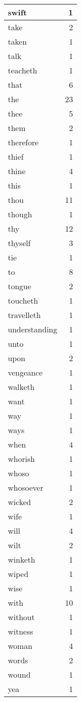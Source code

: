 \begin{center}
\begin{longtable}{l|r}
swift & 1\\ \hline 
take & 2\\ \hline 
taken & 1\\ \hline 
talk & 1\\ \hline 
teacheth & 1\\ \hline 
that & 6\\ \hline 
the & 23\\ \hline 
thee & 5\\ \hline 
them & 2\\ \hline 
therefore & 1\\ \hline 
thief & 1\\ \hline 
thine & 4\\ \hline 
this & 1\\ \hline 
thou & 11\\ \hline 
though & 1\\ \hline 
thy & 12\\ \hline 
thyself & 3\\ \hline 
tie & 1\\ \hline 
to & 8\\ \hline 
tongue & 2\\ \hline 
toucheth & 1\\ \hline 
travelleth & 1\\ \hline 
understanding & 1\\ \hline 
unto & 1\\ \hline 
upon & 2\\ \hline 
vengeance & 1\\ \hline 
walketh & 1\\ \hline 
want & 1\\ \hline 
way & 1\\ \hline 
ways & 1\\ \hline 
when & 4\\ \hline 
whorish & 1\\ \hline 
whoso & 1\\ \hline 
whosoever & 1\\ \hline 
wicked & 2\\ \hline 
wife & 1\\ \hline 
will & 4\\ \hline 
wilt & 2\\ \hline 
winketh & 1\\ \hline 
wiped & 1\\ \hline 
wise & 1\\ \hline 
with & 10\\ \hline 
without & 1\\ \hline 
witness & 1\\ \hline 
woman & 4\\ \hline 
words & 2\\ \hline 
wound & 1\\ \hline 
yea & 1\\ \hline 
\end{longtable}  
\end{center}  


